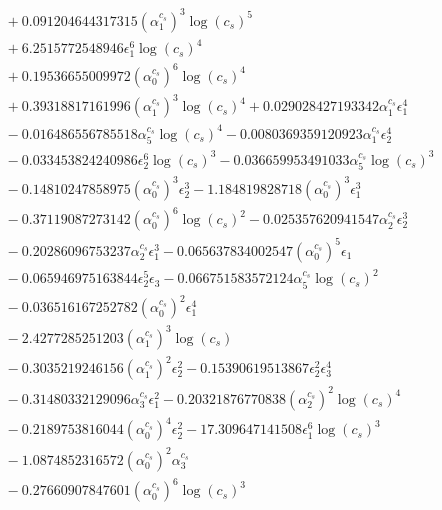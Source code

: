 \documentclass[10pt]{article}
\begin{document}
\begin{align*}
&{}  + 0.091204644317315 \left(\alpha_{1}^{c_s}\right)^{3} \log{\left(c_{s} \right)}^{5} \\
&{}  + 6.2515772548946 \epsilon_{1}^{6} \log{\left(c_{s} \right)}^{4} \\
&{}  + 0.19536655009972 \left(\alpha_{0}^{c_s}\right)^{6} \log{\left(c_{s} \right)}^{4} \\
&{}  + 0.39318817161996 \left(\alpha_{1}^{c_s}\right)^{3} \log{\left(c_{s} \right)}^{4} + 0.029028427193342 \alpha_{1}^{c_s} \epsilon_{1}^{4} \\
&{}  - 0.016486556785518 \alpha_{5}^{c_s} \log{\left(c_{s} \right)}^{4} - 0.0080369359120923 \alpha_{1}^{c_s} \epsilon_{2}^{4} \\
&{}  - 0.033453824240986 \epsilon_{2}^{6} \log{\left(c_{s} \right)}^{3} - 0.036659953491033 \alpha_{5}^{c_s} \log{\left(c_{s} \right)}^{3} \\
&{}  - 0.14810247858975 \left(\alpha_{0}^{c_s}\right)^{3} \epsilon_{2}^{3} - 1.184819828718 \left(\alpha_{0}^{c_s}\right)^{3} \epsilon_{1}^{3} \\
&{}  - 0.37119087273142 \left(\alpha_{0}^{c_s}\right)^{6} \log{\left(c_{s} \right)}^{2} - 0.025357620941547 \alpha_{2}^{c_s} \epsilon_{2}^{3} \\
&{}  - 0.20286096753237 \alpha_{2}^{c_s} \epsilon_{1}^{3} - 0.065637834002547 \left(\alpha_{0}^{c_s}\right)^{5} \epsilon_{1} \\
&{}  - 0.065946975163844 \epsilon_{2}^{5} \epsilon_{3} - 0.066751583572124 \alpha_{5}^{c_s} \log{\left(c_{s} \right)}^{2} \\
&{}  - 0.036516167252782 \left(\alpha_{0}^{c_s}\right)^{2} \epsilon_{1}^{4} \\
&{}  - 2.4277285251203 \left(\alpha_{1}^{c_s}\right)^{3} \log{\left(c_{s} \right)} \\
&{}  - 0.3035219246156 \left(\alpha_{1}^{c_s}\right)^{2} \epsilon_{2}^{2} - 0.15390619513867 \epsilon_{2}^{2} \epsilon_{3}^{4} \\
&{}  - 0.31480332129096 \alpha_{3}^{c_s} \epsilon_{1}^{2} - 0.20321876770838 \left(\alpha_{2}^{c_s}\right)^{2} \log{\left(c_{s} \right)}^{4} \\
&{}  - 0.2189753816044 \left(\alpha_{0}^{c_s}\right)^{4} \epsilon_{2}^{2} - 17.309647141508 \epsilon_{1}^{6} \log{\left(c_{s} \right)}^{3} \\
&{}  - 1.0874852316572 \left(\alpha_{0}^{c_s}\right)^{2} \alpha_{3}^{c_s} \\
&{}  - 0.27660907847601 \left(\alpha_{0}^{c_s}\right)^{6} \log{\left(c_{s} \right)}^{3} \\

\end{align*}
\end{document}
